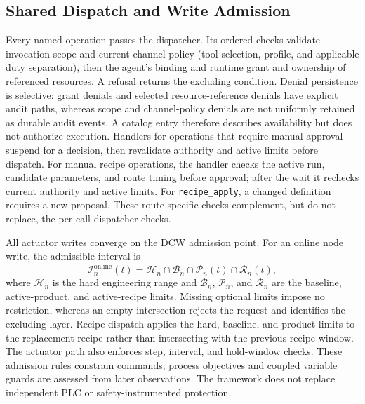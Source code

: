 \subsection{Shared Dispatch and Write Admission}
\label{sec:governed}
Every named operation passes the dispatcher. Its ordered checks validate
invocation scope and current channel policy (tool selection, profile, and
applicable duty separation), then the agent's binding and runtime grant and
ownership of referenced resources.
A refusal returns the excluding condition. Denial persistence is selective:
grant denials and selected resource-reference denials have explicit audit
paths, whereas scope and channel-policy denials are not uniformly retained as
durable audit events. A catalog entry therefore describes availability but
does not authorize execution. Handlers for operations that require manual
approval suspend for a decision, then revalidate authority and active limits
before dispatch. For manual recipe operations, the handler checks the active
run, candidate parameters, and route timing before approval; after the wait it
rechecks current authority and active limits. For \texttt{recipe\_apply}, a
changed definition requires a new proposal. These route-specific checks
complement, but do not replace, the per-call dispatcher checks.

All actuator writes converge on the DCW admission point. For an online node
write, the admissible interval is
\begin{equation}
\mathcal{I}^{\mathrm{online}}_n(t)=\mathcal{H}_n\cap\mathcal{B}_n
\cap\mathcal{P}_n(t)\cap\mathcal{R}_n(t),
\label{eq:admission}
\end{equation}
where $\mathcal{H}_n$ is the hard engineering range and $\mathcal{B}_n$,
$\mathcal{P}_n$, and $\mathcal{R}_n$ are the baseline, active-product, and
active-recipe limits. Missing optional limits impose no restriction, whereas
an empty intersection rejects the request and identifies the excluding
layer. Recipe dispatch applies the hard, baseline, and product limits to the
replacement recipe rather than intersecting with the previous recipe window.
The actuator path also enforces step, interval, and hold-window checks.
These admission rules constrain commands; process objectives and coupled
variable guards are assessed from later observations. The framework does
not replace independent PLC or safety-instrumented protection.

